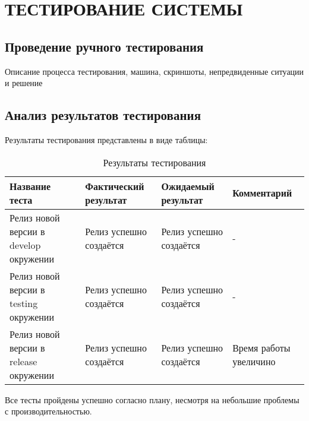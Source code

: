 \chapter{ТЕСТИРОВАНИЕ СИСТЕМЫ}
\label{cha:research}

\section{Проведение ручного тестирования}

Описание процесса тестирования, машина, скриншоты, непредвиденные ситуации и решение

\section{Анализ результатов тестирования}

Результаты тестирования представлены в виде таблицы:

\begin{center}
    \begin{longtable}{|p{}|p{}|p{}|p{}|}
        \caption{Результаты тестирования}
        \label{tab:testing-res}
        \hline
        Название теста & Фактический результат & Ожидаемый результат & Комментарий \\
        \hline
        Релиз новой версии в develop окружении & Релиз успешно создаётся & Релиз успешно создаётся & - \\
        \hline
        Релиз новой версии в testing окружении & Релиз успешно создаётся & Релиз успешно создаётся & - \\
        \hline
        Релиз новой версии в release окружении & Релиз успешно создаётся & Релиз успешно создаётся & Время работы увеличино \\
        \hline
    \end{longtable}
\end{center}

Все тесты пройдены успешно согласно плану, несмотря на небольшие проблемы с производительностью.


